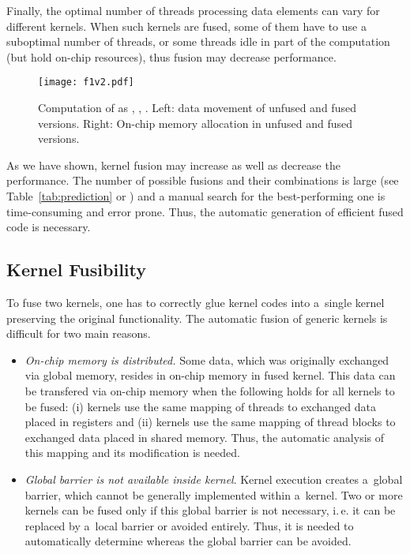\documentclass[final]{siamltex}
\def\ie{i.\,e.}
\begin{document}
Finally, the optimal number of threads processing data elements can vary for different kernels. When such kernels are fused, some of them have to use a suboptimal number of threads, or some threads idle in part of the computation (but hold on-chip resources), thus fusion may decrease performance.

\begin{figure}[t]
\centering
\texttt{[image: f1v2.pdf]}
\caption{Computation of  as , , . Left: data movement of unfused and fused versions. Right: On-chip memory allocation in unfused and fused versions.}
\label{fig:fusion-ilustration}
\end{figure}

As we have shown, kernel fusion may increase as well as decrease the performance. The number of possible fusions and their combinations is large (see Table~\ref{tab:prediction} or \cite{filipovic2012automatically}) and a manual search for the best-performing one is time-consuming and error prone. Thus, the automatic generation of efficient fused code is necessary.

\subsection{Kernel Fusibility}
\label{subsect:kerfus}

To fuse two kernels, one has to correctly glue kernel codes into a~single kernel preserving the original functionality. The automatic fusion of generic kernels is difficult for two main reasons.
\begin{itemize}
        \item \textit{On-chip memory is distributed.} Some data, which was originally exchanged via global memory, resides in on-chip memory in fused kernel. This data can be transfered via on-chip memory when the following holds for all kernels to be fused: (i) kernels use the same mapping of threads to exchanged data placed in registers and (ii) kernels use the same mapping of thread blocks to exchanged data placed in shared memory. Thus, the automatic analysis of this mapping and its modification is needed.\item \textit{Global barrier is not available inside kernel}. Kernel execution creates a~global barrier, which cannot be generally implemented within a~kernel. Two or more kernels can be fused only if this global barrier is not necessary, \ie{} it can be replaced by a~local barrier or avoided entirely. Thus, it is needed to automatically determine whereas the global barrier can be avoided.\end{itemize}
\end{document}
